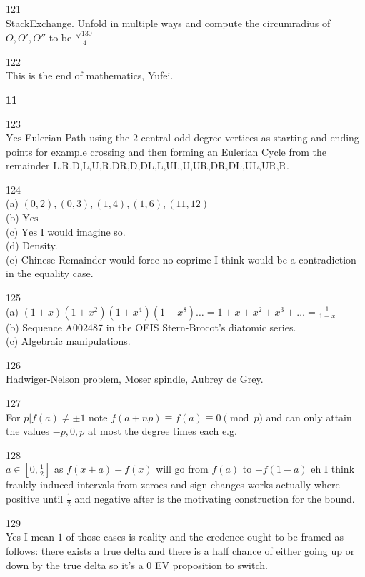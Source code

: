 121 \\
StackExchange. Unfold in multiple ways and compute the circumradius of $O,O',O''$ to be $\boxed{\frac{\sqrt{130}}{4}}$

122 \\
This is the end of mathematics, Yufei.

\newpage

\textbf{11}

123 \\
$\boxed{\text{Yes}}$ Eulerian Path using the $2$ central odd degree vertices as starting and ending points for example crossing and then forming an Eulerian Cycle from the remainder L,R,D,L,U,R,DR,D,DL,L,UL,U,UR,DR,DL,UL,UR,R.

124 \\
(a) $\boxed{(0,2),(0,3),(1,4),(1,6),(11,12)}$ \\
(b) $\boxed{\text{Yes}}$ \\
(c) $\boxed{\text{Yes}}$ I would imagine so. \\
(d) Density. \\
(e) Chinese Remainder would force no coprime I think would be a contradiction in the equality case.

125 \\
(a) $(1+x)(1+x^2)(1+x^4)(1+x^8)\dots=1+x+x^2+x^3+\dots=\boxed{\frac{1}{1-x}}$ \\
(b) Sequence A002487 in the OEIS Stern-Brocot's diatomic series. \\
(c) Algebraic manipulations.

126 \\
Hadwiger-Nelson problem, Moser spindle, Aubrey de Grey.

127 \\
For $p|f(a)\neq \pm 1$ note $f(a+np) \equiv f(a) \equiv 0 \pmod{p}$ and can only attain the values $-p,0,p$ at most the degree times each e.g.

128 \\
$\boxed{a\in \left[0,\frac{1}{2} \right]}$ as $f(x+a)-f(x)$ will go from $f(a)$ to $-f(1-a)$ eh I think frankly induced intervals from zeroes and sign changes works actually where positive until $\frac{1}{2}$ and negative after is the motivating construction for the bound.

129 \\
Yes I mean $1$ of those cases is reality and the credence ought to be framed as follows: there exists a true delta and there is a half chance of either going up or down by the true delta so it's a $0$ EV proposition to switch.

